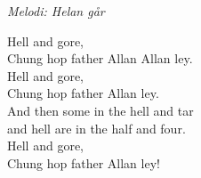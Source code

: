 {\footnotesize\textit{Melodi: Helan går}}\par
\vspace{10pt}
Hell and gore,\\
Chung hop father Allan Allan ley.\\
Hell and gore,\\
Chung hop father Allan ley.\\
And then some in the hell and tar\\
and hell are in the half and four.\\
Hell and gore,\\
Chung hop father Allan ley!
